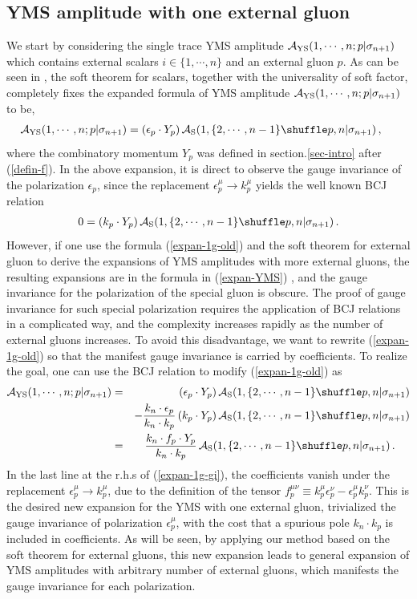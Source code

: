 \documentclass[11pt,a4paper]{article}
\newcommand{\bea}{\begin{eqnarray}}
\newcommand{\eea}{\end{eqnarray}}
\newcommand{\nn}{\nonumber \\}
\def\eref#1{(\ref{#1})}
\begin{document}
\subsection{YMS amplitude with one external gluon}
\label{subsec-1gluon}

We start by considering the single trace YMS amplitude ${\cal A}_{\rm YS}(1,\cdots,n;p|\sigma_{n+1})$ which contains external scalars $i\in\{1,\cdots,n\}$
and an external gluon $p$. As can be seen in \cite{Zhou:2022orv}, the soft theorem for scalars, together with the universality of soft factor, completely fixes the expanded formula of
YMS amplitude ${\cal A}_{\rm YS}(1,\cdots,n;p|\sigma_{n+1})$ to be,
%
\bea
{\cal A}_{\rm YS}(1,\cdots,n;p|\sigma_{n+1})=(\epsilon_p\cdot Y_p)\,{\cal A}_{\rm S}(1,\{2,\cdots,n-1\}\shuffle p,n|\sigma_{n+1})\,,~~~~\label{expan-1g-old}
\eea
%
where the combinatory momentum $Y_p$ was defined in section.\ref{sec-intro} after \eref{defin-f}.
In the above expansion, it is direct to observe the gauge invariance of the polarization $\epsilon_p$, since the replacement $\epsilon_p^\mu\to k_p^\mu$ yields the well known BCJ relation
%
\bea
0=(k_p\cdot Y_p)\,{\cal A}_{\rm S}(1,\{2,\cdots,n-1\}\shuffle p,n|\sigma_{n+1})\,.
\eea
%
However, if one use the formula \eref{expan-1g-old} and the soft theorem for external gluon to derive the expansions of YMS amplitudes with more external gluons, the resulting expansions are in the formula in \eref{expan-YMS} \cite{Zhou:2022orv}, and
the gauge invariance for the polarization of the special gluon is obscure. The proof of gauge invariance for such special polarization requires the application of BCJ relations in a complicated way, and the complexity increases rapidly as the number of external gluons increases. To avoid this disadvantage, we want to
rewrite \eref{expan-1g-old} so that the manifest gauge invariance is carried by coefficients. To realize the goal,
one can use the BCJ relation to modify \eref{expan-1g-old} as
%
\bea
{\cal A}_{\rm YS}(1,\cdots,n;p|\sigma_{n+1})
&=&(\epsilon_p\cdot Y_p)\,{\cal A}_{\rm S}(1,\{2,\cdots,n-1\}\shuffle p,n|\sigma_{n+1})\nn
& &-{k_n\cdot\epsilon_p\over k_n\cdot k_p}\,(k_p\cdot Y_p)\,{\cal A}_{\rm S}(1,\{2,\cdots,n-1\}\shuffle p,n|\sigma_{n+1})\nn
&=&{k_n\cdot f_p\cdot Y_p\over k_n\cdot k_p}\,{\cal A}_{\rm S}(1,\{2,\cdots,n-1\}\shuffle p,n|\sigma_{n+1})\,.~~~~\label{expan-1g-gi}
\eea
%
In the last line at the r.h.s of \eref{expan-1g-gi}, the coefficients vanish under the replacement $\epsilon_p^\mu\to k_p^\mu$,
due to the definition of the tensor $f^{\mu\nu}_p\equiv k^\mu_p\epsilon^\nu_p-\epsilon^\mu_p k^\nu_p$. This is the desired new expansion for the YMS with one external gluon, trivialized the gauge invariance of polarization $\epsilon^\mu_p$, with the cost that a spurious pole $k_n\cdot k_p$ is included in coefficients. As will be seen, by applying our method based on the soft theorem for external gluons, this new expansion leads to general expansion of YMS amplitudes with arbitrary number of external gluons, which manifests the gauge invariance for each polarization.
\end{document}
